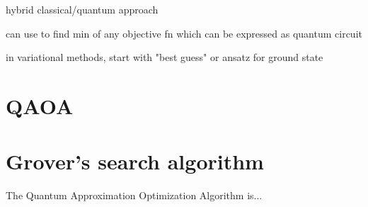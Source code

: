 \documentclass[a4paper,landscape,columns=3]{CheatSheet}
\begin{document}
hybrid classical/quantum approach

can use to find min of any objective fn which can be expressed as quantum circuit

in variational methods, start with "best guess" or ansatz for ground state





\section{QAOA}

\section{Grover's search algorithm}

The Quantum Approximation Optimization Algorithm is...

%
%

% 
\end{document}
